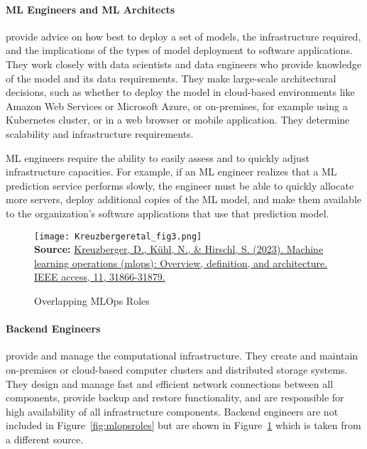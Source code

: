 \paragraph*{ML Engineers and ML Architects} provide advice on how best to deploy a set of models, the infrastructure required, and the implications of the types of model deployment to software applications. They work closely with data scientists and data engineers who provide knowledge of the model and its data requirements. They make large-scale architectural decisions, such as whether to deploy the model in cloud-based environments like Amazon Web Services or Microsoft Azure, or on-premises, for example using a Kubernetes cluster, or in a web browser or mobile application. They determine scalability and infrastructure requirements.

ML engineers require the ability to easily assess and to quickly adjust infrastructure capacities. For example, if an ML engineer realizes that a ML prediction service performs slowly, the engineer must be able to quickly allocate more servers, deploy additional copies of the ML model, and make them available to the organization's software applications that use that prediction model. 

\begin{figure}
\centering
\texttt{[image: Kreuzbergeretal\_fig3.png]}  \\

\scriptsize \textbf{Source:} \href{https://ieeexplore.ieee.org/abstract/document/10081336}{Kreuzberger, D., K\"uhl, N., \& Hirschl, S. (2023). Machine learning operations (mlops): Overview, definition, and architecture. IEEE access, 11, 31866-31879.}
\caption{Overlapping MLOps Roles}
\label{fig:mlopsskills}
\end{figure}

\paragraph*{Backend Engineers} provide and manage the computational infrastructure. They create and maintain on-premises or cloud-based computer clusters and distributed storage systems. They design and manage fast and efficient network connections between all components, provide backup and restore functionality, and are responsible for high availability of all infrastructure components. Backend engineers are not included in Figure~\ref{fig:mlopsroles} but are shown in Figure~\ref{fig:mlopsskills} which is taken from a different source.

